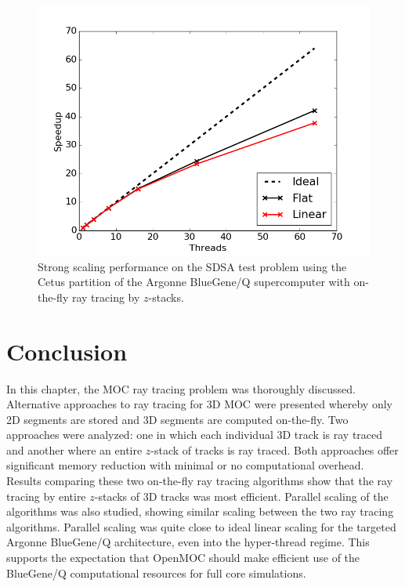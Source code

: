 \begin{figure}[ht!]
	\centering
	\includegraphics[width=0.75\linewidth]{figures/results/performance/flat_linear_speedup.png}
	\caption{Strong scaling performance on the SDSA test problem using the Cetus partition of the Argonne BlueGene/Q supercomputer with on-the-fly ray tracing by $z$-stacks.}
	\label{fig:rt-parallel-cetus}
\end{figure}

\newpage
%
\section{Conclusion} 
\label{sec:rt-conclusion}

In this chapter, the \ac{MOC} ray tracing problem was thoroughly discussed. Alternative approaches to ray tracing for 3D \ac{MOC} were presented whereby only 2D segments are stored and 3D segments are computed on-the-fly. Two approaches were analyzed: one in which each individual 3D track is ray traced and another where an entire $z$-stack of tracks is ray traced. Both approaches offer significant memory reduction with minimal or no computational overhead. Results comparing these two on-the-fly ray tracing algorithms show that the ray tracing by entire $z$-stacks of 3D tracks was most efficient. Parallel scaling of the algorithms was also studied, showing similar scaling between the two ray tracing algorithms. Parallel scaling was quite close to ideal linear scaling for the targeted Argonne BlueGene/Q architecture, even into the hyper-thread regime. This supports the expectation that OpenMOC should make efficient use of the BlueGene/Q computational resources for full core simulations.

